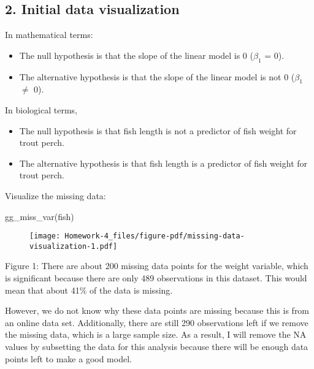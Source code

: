 \documentclass[
  letterpaper,
  DIV=11,
  numbers=noendperiod]{scrartcl}
\newenvironment{Shaded}{\begin{snugshade}}{\end{snugshade}}
\newcommand{\FunctionTok}[1]{\textcolor[rgb]{0.28,0.35,0.67}{#1}}
\newcommand{\NormalTok}[1]{\textcolor[rgb]{0.00,0.23,0.31}{#1}}
\providecommand{\tightlist}{%
  \setlength{\itemsep}{0pt}\setlength{\parskip}{0pt}}\usepackage{longtable,booktabs,array}
\begin{document}
\hypertarget{initial-data-visualization}{%
\subsection{2. Initial data
visualization}\label{initial-data-visualization}}

In mathematical terms:

\begin{itemize}
\tightlist
\item
  The null hypothesis is that the slope of the linear model is 0
  (\(\beta_1\) = 0).
\item
  The alternative hypothesis is that the slope of the linear model is
  not 0 (\(\beta_1\) \(\neq\) 0).
\end{itemize}

In biological terms,

\begin{itemize}
\item
  The null hypothesis is that fish length is not a predictor of fish
  weight for trout perch.
\item
  The alternative hypothesis is that fish length is a predictor of fish
  weight for trout perch.
\end{itemize}

Visualize the missing data:

\begin{Shaded}
\begin{Highlighting}[]
\FunctionTok{gg\_miss\_var}\NormalTok{(fish)}
\end{Highlighting}
\end{Shaded}

\begin{figure}[H]

{\centering \texttt{[image: Homework-4\_files/figure-pdf/missing-data-visualization-1.pdf]}

}

\end{figure}

Figure 1: There are about 200 missing data points for the weight
variable, which is significant because there are only 489 observations
in this dataset. This would mean that about 41\% of the data is missing.

However, we do not know why these data points are missing because this
is from an online data set. Additionally, there are still 290
observations left if we remove the missing data, which is a large sample
size. As a result, I will remove the NA values by subsetting the data
for this analysis because there will be enough data points left to make
a good model.
\end{document}
